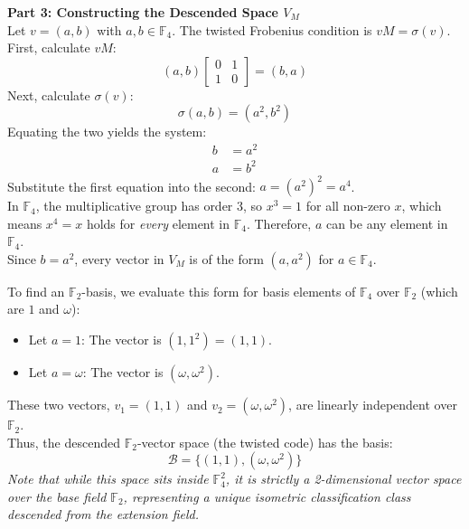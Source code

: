 \documentclass[11pt, a4paper, twoside]{article}
\newcommand{\F}{\mathbb{F}}
\begin{document}
		\vspace{1em}
		\textbf{Part 3: Constructing the Descended Space $V_M$}\\
		Let $v = (a, b)$ with $a, b \in \F_4$. The twisted Frobenius condition is $v M = \sigma(v)$. \\
		First, calculate $v M$:
		$$ (a, b) \begin{bmatrix} 0 & 1 \\ 1 & 0 \end{bmatrix} = (b, a) $$
		Next, calculate $\sigma(v)$:
		$$ \sigma(a, b) = (a^2, b^2) $$
		Equating the two yields the system:
		\begin{align*}
			b &= a^2 \\
			a &= b^2
		\end{align*}
		Substitute the first equation into the second: $a = (a^2)^2 = a^4$. \\
		In $\F_4$, the multiplicative group has order 3, so $x^3 = 1$ for all non-zero $x$, which means $x^4 = x$ holds for \textit{every} element in $\F_4$. Therefore, $a$ can be any element in $\F_4$. \\
		Since $b = a^2$, every vector in $V_M$ is of the form $(a, a^2)$ for $a \in \F_4$. 
		
		To find an $\F_2$-basis, we evaluate this form for basis elements of $\F_4$ over $\F_2$ (which are $1$ and $\omega$):
		\begin{itemize}
			\item Let $a = 1$: The vector is $(1, 1^2) = (1, 1)$.
			\item Let $a = \omega$: The vector is $(\omega, \omega^2)$.
		\end{itemize}
		These two vectors, $v_1 = (1, 1)$ and $v_2 = (\omega, \omega^2)$, are linearly independent over $\F_2$. \\
		Thus, the descended $\F_2$-vector space (the twisted code) has the basis:
		$$ \mathcal{B} = \{ (1, 1), (\omega, \omega^2) \} $$
		\textit{Note that while this space sits inside $\F_4^2$, it is strictly a 2-dimensional vector space over the base field $\F_2$, representing a unique isometric classification class descended from the extension field.}
	
\end{document}
